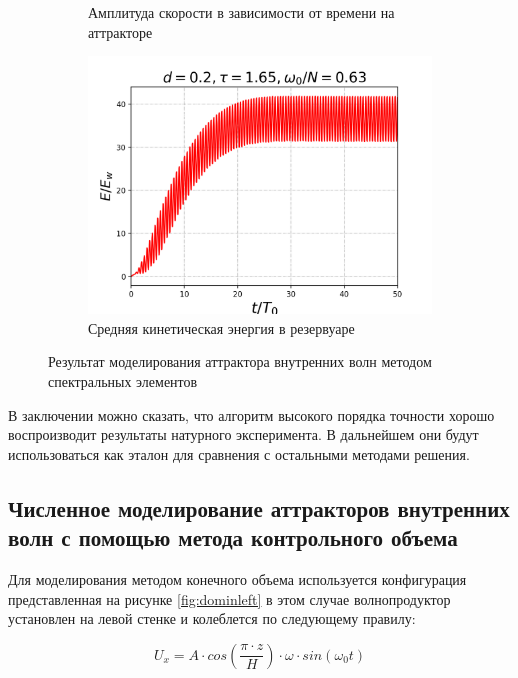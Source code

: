 \begin{figure}[!ht]
\begin{subfigure}[с]{0.45\textwidth}
        \caption{Амплитуда скорости в зависимости от времени на аттракторе}
    \end{subfigure}
    \begin{subfigure}[с]{0.45\textwidth}
        \includegraphics[scale=0.4]{pics/H40L60N1ap02dp20w0p63/2D36x36DiagramH40L60N1ap02dp20w0p63totKEnonDim.png}
        \caption{Средняя кинетическая энергия в резервуаре}
    \end{subfigure}
    
    \caption{Результат моделирования аттрактора внутренних волн методом спектральных элементов}

\end{figure}

В заключении можно сказать, что алгоритм высокого порядка точности хорошо воспроизводит результаты натурного эксперимента. В дальнейшем они будут использоваться как эталон для сравнения с остальными методами решения. 

\subsection{Численное моделирование аттракторов внутренних волн с помощью метода контрольного объема}

Для моделирования методом конечного объема используется конфигурация представленная на рисунке \ref{fig:dominleft} в этом случае волнопродуктор установлен на левой стенке и колеблется по следующему правилу:

\begin{equation}
    U_x = A\cdot cos\left(\frac{\pi \cdot z}{H}\right)\cdot \omega \cdot  sin(\omega_0 t)
\end{equation}

